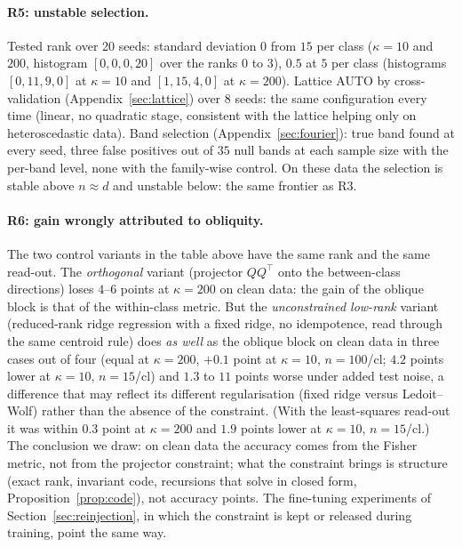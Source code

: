 \documentclass[11pt,a4paper]{article}
\theoremstyle{plain}
\theoremstyle{definition}
\theoremstyle{remark}
\newcommand{\T}{\top}
\begin{document}
\paragraph{R5: unstable selection.} Tested rank over 20 seeds: standard
deviation $0$ from $15$ per class ($\kappa=10$ and $200$, histogram
$[0,0,0,20]$ over the ranks $0$ to $3$), $0.5$ at $5$ per class
(histograms $[0,11,9,0]$ at $\kappa=10$ and $[1,15,4,0]$ at $\kappa=200$). Lattice
AUTO by cross-validation (Appendix~\ref{sec:lattice}) over 8 seeds: the same
configuration every time (linear, no quadratic stage, consistent with the
lattice helping only on heteroscedastic data). Band selection
(Appendix~\ref{sec:fourier}): true band found at every seed, three false
positives out of $35$ null bands at each sample size with the per-band
level, none with the family-wise control. On these data the
selection is stable above $n\approx d$ and unstable below: the same
frontier as R3.

\paragraph{R6: gain wrongly attributed to obliquity.} The two control
variants in the table above have the same rank and the same read-out. The
\emph{orthogonal} variant (projector $QQ^\T$ onto the between-class
directions) loses $4$--$6$ points at $\kappa=200$ on clean data: the gain of
the oblique block is that of the within-class metric. But the
\emph{unconstrained low-rank} variant (reduced-rank ridge regression with a
fixed ridge, no idempotence, read through the same centroid rule) does
\emph{as well} as the oblique block on clean data in three cases out of four
(equal at $\kappa=200$, $+0.1$ point at $\kappa=10$, $n=100$/cl; $4.2$ points
lower at $\kappa=10$, $n=15$/cl) and $1.3$ to $11$ points worse under added
test noise, a difference that may reflect its different regularisation
(fixed ridge versus Ledoit--Wolf) rather than the absence of the
constraint. (With the least-squares read-out it was within $0.3$ point at
$\kappa=200$ and $1.9$ points lower at $\kappa=10$, $n=15$/cl.) The conclusion we
draw: on clean data the accuracy comes from the Fisher metric, not from the
projector constraint; what the constraint brings is structure (exact rank,
invariant code, recursions that solve in closed form, Proposition~\ref{prop:code}), not
accuracy points. The fine-tuning experiments of
Section~\ref{sec:reinjection}, in which the constraint is kept or released
during training, point the same way.
\end{document}
